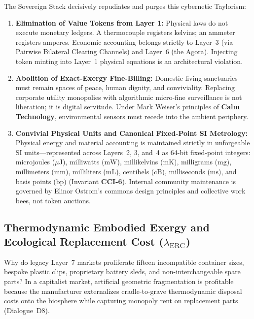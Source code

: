 The Sovereign Stack decisively repudiates and purges this cybernetic Taylorism:
\begin{enumerate}
    \item \textbf{Elimination of Value Tokens from Layer 1:} Physical laws do not execute monetary ledgers. A thermocouple registers kelvins; an ammeter registers amperes. Economic accounting belongs strictly to Layer~3 (via Pairwise Bilateral Clearing Channels) and Layer~6 (the Agora). Injecting token minting into Layer~1 physical equations is an architectural violation.
    \item \textbf{Abolition of Exact-Exergy Fine-Billing:} Domestic living sanctuaries must remain spaces of peace, human dignity, and conviviality. Replacing corporate utility monopolies with algorithmic micro-fine surveillance is not liberation; it is digital servitude. Under Mark Weiser's principles of \textbf{Calm Technology}, environmental sensors must recede into the ambient periphery.
    \item \textbf{Convivial Physical Units and Canonical Fixed-Point SI Metrology:} Physical energy and material accounting is maintained strictly in unforgeable SI units---represented across Layers~2, 3, and~4 as 64-bit fixed-point integers: microjoules ($\mu\mathrm{J}$), milliwatts ($\mathrm{mW}$), millikelvins ($\mathrm{mK}$), milligrams ($\mathrm{mg}$), millimeters ($\mathrm{mm}$), milliliters ($\mathrm{mL}$), centibels ($\mathrm{cB}$), milliseconds ($\mathrm{ms}$), and basis points ($\mathrm{bp}$) (Invariant \textbf{CCI-6}). Internal community maintenance is governed by Elinor Ostrom's commons design principles and collective work bees, not token auctions.
\end{enumerate}

\subsection{Thermodynamic Embodied Exergy and Ecological Replacement Cost \texorpdfstring{($\lambda_{\mathrm{ERC}}$)}{(lambda\_ERC)}}
\label{subsec:th_erc_modular_convergence}
Why do legacy Layer~7 markets proliferate fifteen incompatible container sizes, bespoke plastic clips, proprietary battery sleds, and non-interchangeable spare parts? In a capitalist market, artificial geometric fragmentation is profitable because the manufacturer externalizes cradle-to-grave thermodynamic disposal costs onto the biosphere while capturing monopoly rent on replacement parts (Dialogue~D8).


